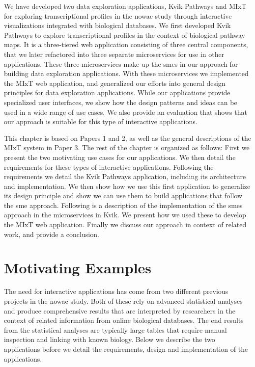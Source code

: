 We have developed two data exploration applications, Kvik
Pathways\cite{fjukstad2015kvik} and
MIxT\cite{fjukstad2017building,dumeaux2017interactions} for exploring
transcriptional profiles in the \gls{nowac} study through interactive
visualizations integrated with biological databases. We first developed Kvik
Pathways to explore transcriptional profiles in the context of biological
pathway maps. It is a three-tiered web application consisting of three central
components, that we later refactored into three separate microservices for use
in other applications. These three microservices make up the \glspl{sme} in our
approach for building data exploration applications.  With these microservices
we implemented the MIxT web application, and generalized our efforts into
general design principles for data exploration applications. 
While our applications
provide specialized user interfaces, we show how the design patterns and ideas
can be used in a wide range of use cases. We also provide an evaluation that
shows that our approach is suitable for this type of interactive applications. 

This chapter is based on Papers 1 and 2, as well as the general descriptions of
the MIxT system in Paper 3. 
The rest of the chapter is organized as follows: First we present the two
motivating use cases for our applications. We then detail the requirements for
these types of interactive applications. Following the requirements we detail
the Kvik Pathways application, including its architecture and implementation. We
then show how we use this first application to generalize its design principle
and show we can use them to build applications that follow the \gls{sme}
approach. Following is a description of the implementation of the \glspl{sme}
approach in the microservices in Kvik. We present how we used these to develop
the MIxT web application. Finally we discuss our approach in context of related
work, and provide a conclusion. 

\section{Motivating Examples}
The need for interactive applications has come from two different previous
projects in the \gls{nowac} study. Both of these rely on advanced statistical
analyses and produce comprehensive results that are interpreted by researchers
in the context of related information from online biological databases. The end
results from the statistical analyses are typically large tables that require
manual inspection and linking with known biology. Below we describe the two
applications before we detail the requirements, design and implementation of the
applications.

